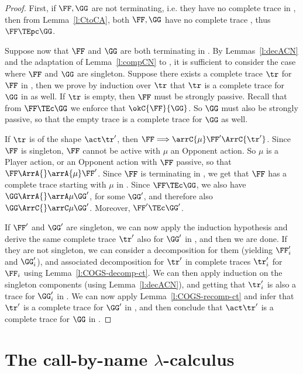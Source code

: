 \begin{proof}
First, if $\FF,\GG$ are not terminating, i.e. they have no complete trace in \AOGS, 
then from Lemma~\ref{l:CtoCA}, both 
$\FF,\GG$ have no complete trace \COGS, thus
$\FF \TEpc \GG$. 

Suppose now that $\FF$ and $\GG$ are both terminating in \AOGS.
By Lemmas~\ref{l:decACN} and the adaptation of Lemma~\ref{l:compCN} to \COGS, it is sufficient to consider 
the case where $\FF$ and $\GG$ are singleton. 
%
Suppose there exists a complete trace $\tr$ for $\FF$ in \COGS, 
then we prove by induction over $\tr$
that $\tr$ is a complete trace for $\GG$ in \COGS as well.
If $\tr$ is empty, then $\FF$ must be strongly passive.
Recall that from $\FF \TEc \GG$ we enforce that
$\okC{\FF}{\GG}$.
So $\GG$ must also be strongly passive, so that 
the empty trace is a complete trace for $\GG$ as well.


If $\tr$ is of the shape $\act\tr'$, then
$\FF \Longrightarrow \arrC {\mu} \FF' \ArrC{\tr'}$.
Since $\FF$ is singleton, $\FF$ cannot be active with $\mu$ an Opponent action.
So $\mu$ is a Player action, or an Opponent action with $\FF$ passive,
so that $\FF \ArrA{}  \arrA {\mu} \FF'$.
Since $\FF$ is terminating in \AOGS, we get that $\FF$ has a complete trace
starting with $\mu$ in \AOGS.
Since 
$\FF  \TEc \GG$, we also have
$\GG \ArrA{} \arrA \mu \GG'$, for some $\GG'$, and therefore also 
$\GG \ArrC{} \arrC \mu \GG'$. 
Moreover, $\FF' \TEc \GG'$.

If $\FF'$ and $\GG'$ are singleton, we can now apply the induction hypothesis 
and derive the same complete trace  $\tr'$ also for $\GG'$ in \COGS, and then we are done. 
%
If they are not singleton, we can consider a decomposition for them 
(yielding $\FF'_i$ and $\GG'_i$), and associated decomposition
for $\tr'$ in complete traces $\tr'_i$ for $\FF_i$ using Lemma~\ref{l:COGS-decomp-ct}. 
We can then apply induction on the singleton components (using
Lemma~\ref{l:decACN}), and getting that
$\tr'_i$ is also a trace for $\GG_i'$ in \COGS. 
We can now apply Lemma~\ref{l:COGS-recomp-ct} 
and infer that $\tr'$ is a complete trace for $\GG'$ in \COGS,
and then conclude that $\act\tr'$ is a complete trace for $\GG$ in \COGS.
\qedhere
\end{proof} 

%
\section{The call-by-name $\lambda$-calculus}
\label{s:cbnNEW}


